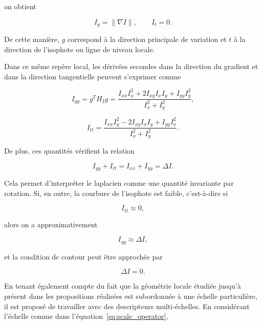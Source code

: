 on obtient

\begin{equation}
I_g=\|\nabla I\|,
\qquad
I_t=0.
\label{eq:local_frame_derivatives}
\end{equation}

De cette manière, \(g\) correspond à la direction principale de variation et \(t\) à la direction de l’isophote ou ligne de niveau locale.

Dans ce même repère local, les dérivées secondes dans la direction du gradient et dans la direction tangentielle peuvent s’exprimer comme

\begin{equation}
I_{gg}=g^T H_I g
=
\frac{I_{xx}I_x^2+2I_{xy}I_xI_y+I_{yy}I_y^2}{I_x^2+I_y^2},
\label{eq:Igg}
\end{equation}

\begin{equation}
I_{tt}=
\frac{I_{xx}I_y^2-2I_{xy}I_xI_y+I_{yy}I_x^2}{I_x^2+I_y^2}.
\label{eq:Itt}
\end{equation}

De plus, ces quantités vérifient la relation

\begin{equation}
I_{gg}+I_{tt}=I_{xx}+I_{yy}=\Delta I.
\label{eq:laplacian_local_frame}
\end{equation}

Cela permet d’interpréter le laplacien comme une quantité invariante par rotation. Si, en outre, la courbure de l’isophote est faible, c’est-à-dire si

\begin{equation}
I_{tt}\approx 0,
\label{eq:weak_isophote_curvature}
\end{equation}

alors on a approximativement

\begin{equation}
I_{gg}\approx \Delta I,
\label{eq:Igg_laplacian_approx}
\end{equation}

et la condition de contour peut être approchée par

\begin{equation}
\Delta I=0.
\label{eq:laplacian_zero_crossing}
\end{equation}

En tenant également compte du fait que la géométrie locale étudiée jusqu’à présent dans les propositions réalisées est subordonnée à une échelle particulière, il est proposé de travailler avec des descripteurs multi-échelles. En considérant l’échelle comme dans l’équation~\eqref{eq:scale_operator},

